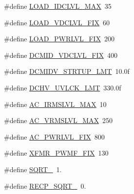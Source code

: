 \begin{DoxyCompactItemize}
\item 
\#define \hyperlink{a00043_a1dd2b3b31e620e021371603376c6980f}{L\-O\-A\-D\-\_\-\-I\-D\-C\-L\-V\-L\-\_\-\-M\-A\-X}~35
\item 
\#define \hyperlink{a00043_ac460f1e706fdf51002f5dfc15c8eb5c9}{L\-O\-A\-D\-\_\-\-V\-D\-C\-L\-V\-L\-\_\-\-F\-I\-X}~60
\item 
\#define \hyperlink{a00043_aea1e2f7c212899b68d0cb6f4fcd1683d}{L\-O\-A\-D\-\_\-\-P\-W\-R\-L\-V\-L\-\_\-\-F\-I\-X}~200
\item 
\#define \hyperlink{a00043_ad873d002fba2a43978755cfb5e9ad5ee}{D\-C\-M\-I\-D\-\_\-\-V\-D\-C\-L\-V\-L\-\_\-\-F\-I\-X}~400
\item 
\#define \hyperlink{a00043_a1bf242d413c347daa05e001e6bf09db6}{D\-C\-M\-I\-D\-V\-\_\-\-S\-T\-R\-T\-U\-P\-\_\-\-L\-M\-T}~10.\-0f
\item 
\#define \hyperlink{a00043_a019110624cdfbea9003fd450564e103a}{D\-C\-H\-V\-\_\-\-U\-V\-L\-C\-K\-\_\-\-L\-M\-T}~330.\-0f
\item 
\#define \hyperlink{a00043_a2b577413184eb560f2f652b11deeba87}{A\-C\-\_\-\-I\-R\-M\-S\-L\-V\-L\-\_\-\-M\-A\-X}~10
\item 
\#define \hyperlink{a00043_afb09d50c3567117fe1f679ab1924d4ec}{A\-C\-\_\-\-V\-R\-M\-S\-L\-V\-L\-\_\-\-M\-A\-X}~250
\item 
\#define \hyperlink{a00043_aa5433ef3bc07259bf870e6e5e115c693}{A\-C\-\_\-\-P\-W\-R\-L\-V\-L\-\_\-\-F\-I\-X}~800
\item 
\#define \hyperlink{a00043_a39c57f59314d3cc076ca98898f227b46}{X\-F\-M\-R\-\_\-\-P\-W\-M\-F\-\_\-\-F\-I\-X}~130
\item 
\#define \hyperlink{a00043_abc63ab2a8e7782de38a5dbdfc33da717}{S\-Q\-R\-T\-\_}~1.
\item 
\#define \hyperlink{a00043_ae468f418f2e6410dfcfeb58bcbbde516}{R\-E\-C\-P\-\_\-\-S\-Q\-R\-T\-\_}~0.
\end{DoxyCompactItemize}
{\bf }\par
